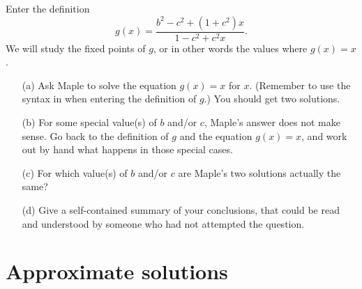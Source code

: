 \documentclass[a4paper,10pt]{amsbook}
\numberwithin{example}{chapter}
\begin{document}
\begin{exercise}\label{ex-mobius-fix}
 Enter the definition
 \[ g(x) = \frac{b^2-c^2+(1+c^2)x}{1-c^2+ c^2x}. \]
 We will study the fixed points of $g$, or in other words the values
 where $g(x)=x$.  
 \begin{itemize}
  \item[(a)] Ask Maple to solve the equation $g(x)=x$ for
   $x$.  (Remember to use the syntax in \note{\NOTEarrow}
   when entering the definition of $g$.)  You should get two
   solutions. 
  \item[(b)] For some special value(s) of $b$ and/or $c$, Maple's
   answer does not make sense.  Go back to the definition of $g$ and
   the equation $g(x)=x$, and work out by hand what happens in those
   special cases.
  \item[(c)] For which value(s) of $b$ and/or $c$ are Maple's two
   solutions actually the same?
  \item[(d)] Give a self-contained summary of your conclusions, that
   could be read and understood by someone who had not attempted the
   question. 
 \end{itemize}
\end{exercise}

\section{Approximate solutions}
\end{document}
